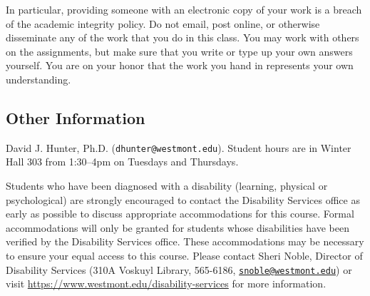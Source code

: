 \documentclass[
  twoside]{article}
\begin{document}
In particular, providing someone with an electronic copy of your work is
a breach of the academic integrity policy. Do not email, post online, or
otherwise disseminate any of the work that you do in this class. You may
work with others on the assignments, but make sure that you write or
type up your own answers yourself. You are on your honor that the work
you hand in represents your own understanding.

\hypertarget{other-information}{%
\subsection{Other Information}\label{other-information}}

\begin{description} \small

\item[Professor:] David J. Hunter, Ph.D.
  (\verb!dhunter@westmont.edu!). Student hours are in Winter Hall 303 
  from 1:30--4pm on Tuesdays and Thursdays.

\item[Accommodations for Students with Disabilities:] Students who have been diagnosed with a disability (learning, physical or psychological) are strongly encouraged to contact the Disability Services office as early as possible to discuss appropriate accommodations for this course. Formal accommodations will only be granted for students whose disabilities have been verified by the Disability Services office.  These accommodations may be necessary to ensure your equal access to this course.  Please contact Sheri Noble, Director of Disability Services (310A Voskuyl Library, 565-6186, \href{mailto:snoble@westmont.edu}{\tt snoble@westmont.edu}) or visit \url{https://www.westmont.edu/disability-services} for more information.


\end{description}
\end{document}
